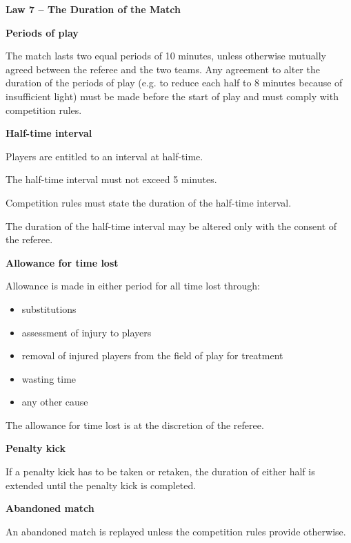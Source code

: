 \clearpage
\sffamily
{\bfseries\color[rgb]{0.4,0.4,0.4}
Law 7 -- The Duration of the Match}
{}

\bigskip

{\bfseries Periods of play }

\headlinebox

The match lasts two equal periods of 10 minutes, unless otherwise mutually agreed between the referee and the two teams. Any agreement to alter the duration of the periods of play (e.g. to reduce each half to 8 minutes because of insufficient light) must be made before the start of play and must comply with competition rules.

\bigskip

{\bfseries Half-time interval}

\headlinebox

Players are entitled to an interval at half-time.

The half-time interval must not exceed 5 minutes.

Competition rules must state the duration of the half-time interval.

The duration of the half-time interval may be altered only with the consent of the referee. 

\bigskip

{\bfseries Allowance for time lost}

\headlinebox

Allowance is made in either period for all time lost through: 

\begin{itemize}
\item substitutions
\item assessment of injury to players
\item removal of injured players from the field of play for treatment 
\item wasting time
\item any other cause
\end{itemize}

The allowance for time lost is at the discretion of the referee.

\bigskip

{\bfseries Penalty kick}

\headlinebox

If a penalty kick has to be taken or retaken, the duration of either half is extended until the penalty kick is completed.

\bigskip

{\sffamily
\textbf{Abandoned match} }

\headlinebox

An abandoned match is replayed unless the competition rules provide otherwise.
